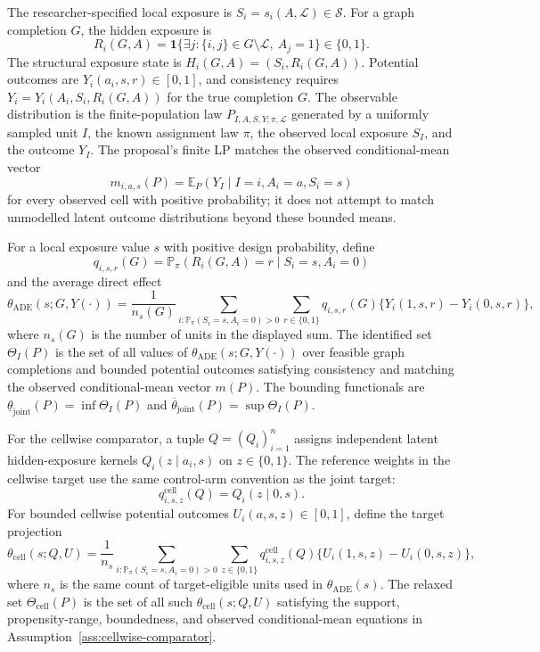 \documentclass[11pt]{article}
\newcommand{\E}{\mathbb{E}}
\renewcommand{\Pr}{\mathbb{P}}
\newcommand{\one}{\mathbf{1}}
\theoremstyle{definition}
\theoremstyle{plain}
\theoremstyle{remark}
\begin{document}
The researcher-specified local exposure is \(S_i=s_i(A,\mathcal L)\in\mathcal S\).  For a graph completion \(G\), the hidden exposure is
\[
R_i(G,A)=\one\{\exists j:\{i,j\}\in G\setminus\mathcal L,\ A_j=1\}\in\{0,1\}.
\]
The structural exposure state is \(H_i(G,A)=(S_i,R_i(G,A))\).  Potential outcomes are \(Y_i(a_i,s,r)\in[0,1]\), and consistency requires \(Y_i=Y_i(A_i,S_i,R_i(G,A))\) for the true completion \(G\).  The observable distribution is the finite-population law \(P_{I,A,S,Y;\pi,\mathcal L}\) generated by a uniformly sampled unit \(I\), the known assignment law \(\pi\), the observed local exposure \(S_I\), and the outcome \(Y_I\).  The proposal's finite LP matches the observed conditional-mean vector
\[
m_{i,a,s}(P)=\E_P(Y_I\mid I=i,A_i=a,S_i=s)
\]
for every observed cell with positive probability; it does not attempt to match unmodelled latent outcome distributions beyond these bounded means.

For a local exposure value \(s\) with positive design probability, define
\[
q_{i,s,r}(G)=\Pr_\pi(R_i(G,A)=r\mid S_i=s,A_i=0)
\]
and the average direct effect
\[
\theta_{\mathrm{ADE}}(s;G,Y(\cdot))
=\frac{1}{n_s(G)}\sum_{i:\Pr_\pi(S_i=s,A_i=0)>0}
\sum_{r\in\{0,1\}}q_{i,s,r}(G)
\{Y_i(1,s,r)-Y_i(0,s,r)\},
\]
where \(n_s(G)\) is the number of units in the displayed sum.  The identified set \(\Theta_I(P)\) is the set of all values of \(\theta_{\mathrm{ADE}}(s;G,Y(\cdot))\) over feasible graph completions and bounded potential outcomes satisfying consistency and matching the observed conditional-mean vector \(m(P)\).  The bounding functionals are \(\underline\theta_{\mathrm{joint}}(P)=\inf\Theta_I(P)\) and \(\overline\theta_{\mathrm{joint}}(P)=\sup\Theta_I(P)\).

For the cellwise comparator, a tuple \(Q=(Q_i)_{i=1}^n\) assigns independent latent hidden-exposure kernels \(Q_i(z\mid a_i,s)\) on \(z\in\{0,1\}\).  The reference weights in the cellwise target use the same control-arm convention as the joint target:
\[
q^{\mathrm{cell}}_{i,s,z}(Q)=Q_i(z\mid 0,s).
\]
For bounded cellwise potential outcomes \(U_i(a,s,z)\in[0,1]\), define the target projection
\[
\theta_{\mathrm{cell}}(s;Q,U)
=\frac{1}{n_s}\sum_{i:\Pr_\pi(S_i=s,A_i=0)>0}
\sum_{z\in\{0,1\}}q^{\mathrm{cell}}_{i,s,z}(Q)
\{U_i(1,s,z)-U_i(0,s,z)\},
\]
where \(n_s\) is the same count of target-eligible units used in \(\theta_{\mathrm{ADE}}(s)\).  The relaxed set \(\Theta_{\mathrm{cell}}(P)\) is the set of all such \(\theta_{\mathrm{cell}}(s;Q,U)\) satisfying the support, propensity-range, boundedness, and observed conditional-mean equations in Assumption~\ref{ass:cellwise-comparator}.
\end{document}
